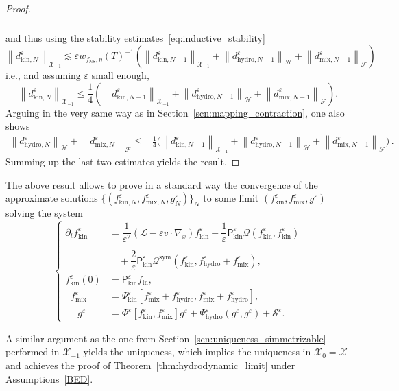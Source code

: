 \documentclass[AHL,Unicode,longabstracts,published]{cedram}
\newcommand{\ini}{\mathrm{in}}
\newcommand{\ns}{\mathrm{NS}}
\newcommand{\hyd}{\mathrm{hydro}}
\newcommand{\mix}{\mathrm{mix}}
\newcommand{\kin}{\mathrm{kin}}
\newcommand{\sym}{\mathrm{sym}}
\newcommand{\LL}{\mathcal{L}}
\newcommand{\PP}{\mathsf{P}}
\newcommand{\QQ}{\mathcal{Q}}
\renewcommand{\SS}{\mathcal{S}}
\newcommand{\FFF}{\mathscr{F}}
\newcommand{\HHH}{\mathscr{H}}
\newcommand{\GGG}{\mathscr{X}}
\newcommand{\SSSs}{\HHH}
\newcommand{\SSSl}{\GGG}
\newcommand{\SSSh}{\pmb{\GGG}}
\newcommand{\SSSm}{\FFF}
\renewcommand*\le{\leqslant}
\newcommand*\eps{{\varepsilon}}
\begin{document}
\begin{proof}
\begin{multline*}
\begin{aligned}
\end{aligned}
\end{multline*}
and thus using the stability estimates~\eqref{eq:inductive_stability}
\[
\left\| d^\eps_{\kin, N} \right\|_{ \SSSh_{-1} } \lesssim \eps w_{ f_\ns, \eta }(T)^{-1} \left(\left\| d^\eps_{\kin, N-1} \right\|_{ \SSSh_{-1}} + \left\| d^\eps_{\hyd, N-1} \right\|_{\SSSs} + \left\| d^\eps_{\mix, N-1} \right\|_{\SSSm} \right)
\]
i.e., and assuming $\eps$ small enough,
\[
\left\| d^\eps_{\kin, N} \right\|_{ \SSSh_{-1} } \le \frac{1}{4} \left(\left\| d^\eps_{\kin, N-1} \right\|_{ \SSSh_{-1}} + \left\| d^\eps_{\hyd, N-1} \right\|_{\SSSs} + \left\| d^\eps_{\mix, N-1} \right\|_{\SSSm} \right).
\]
Arguing in the very same way as in Section~\ref{scn:mapping_contraction}, one also shows
\begin{align*}
\left\| d^\eps_{\hyd, N} \right\|_{ \SSSs } + \left\| d^\eps_{\mix, N} \right\|_{ \SSSm } \le & \frac{1}{4} \bigg(\left\| d^\eps_{\kin, N-1} \right\|_{\SSSh_{-1}} + \left\| d^\eps_{\hyd, N-1} \right\|_{\SSSs} + \left\| d^\eps_{\mix, N-1} \right\|_{\SSSm} \bigg)\,.
\end{align*}
Summing up the last two estimates yields the result.
\end{proof}

The above result allows to prove in a standard way the convergence of the approximate solutions $\{(f^\eps_{\kin, N}, f^\eps_{\mix, N}, g^\eps_N)\}_N$ to some limit $(f^\eps_{\kin}, f^\eps_{\mix}, g^\eps)$ solving the system
\begin{equation*}
\begin{cases}
\partial_t f^\eps_\kin &= \dfrac{1}{\eps^2} \left(\LL - \eps v \cdot \nabla_x\right) f^\eps_\kin  + \dfrac{1}{\eps} \PP^\eps_\kin \QQ\left(f^\eps_\kin, f^\eps_\kin\right)\\ \\
 &\quad + \dfrac{2}{\eps} \PP^\eps_\kin \QQ^\sym\left(f^\eps_\kin, f^\eps_\hyd + f^\eps_\mix\right), \\
 f^\eps_\kin(0) &= \PP^\eps_\kin f_\ini,\\
\;\; f^\eps_\mix &= \Psi^\eps_\kin\left[f^\eps_\mix + f^\eps_\hyd, f^\eps_\mix + f^\eps_\hyd \right],\\
\quad\; g^\eps &= \Phi^\eps\left[f^\eps_\kin, f^\eps_\mix\right] g^\eps + \Psi^\eps_\hyd\left(g^\eps, g^\eps\right) + \SS^\eps.
\end{cases}
\end{equation*}

A similar argument as the one from Section~\ref{scn:uniqueness_simmetrizable} performed in $\SSSh_{-1}$ yields the uniqueness, which implies the uniqueness in $\SSSh_{0} = \SSSl$ and achieves the proof of Theorem~\ref{thm:hydrodynamic_limit} under Assumptions~\ref{BED}.
\end{document}
